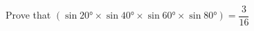 
%
%
%
%
% 
% 
\question[4] Prove that $(\sin\ang{20}\times\sin\ang{40}\times\sin\ang{60}\times\sin\ang{80}) = \dfrac{3}{16}$

\ifprintanswers
\fi 

